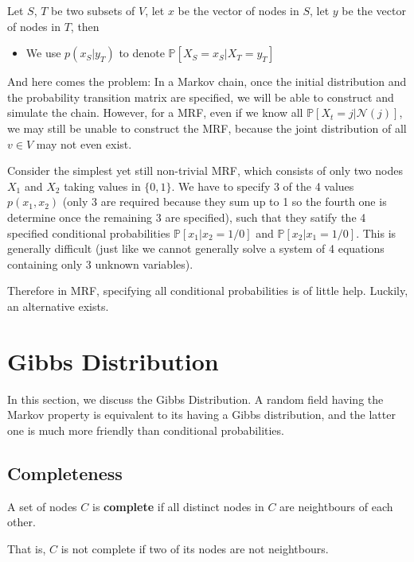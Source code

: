         Let $S$, $T$ be two subsets of $V$, let $x$ be the vector of nodes in $S$, let $y$ be the vector of nodes in $T$, then
        \begin{itemize}
            \item We use $p(x_S|y_T)$ to denote $\mathbb{P}[X_S=x_S|X_T=y_T]$
        \end{itemize}

        And here comes the problem: In a Markov chain, once the initial distribution and the probability transition matrix are specified, we will be able to construct and simulate the chain. However, for a MRF, even if we know all $\mathbb{P}[X_t=j|\mathcal{N}(j)]$, we may still be unable to construct the MRF, because the joint distribution of all $v \in V$ may not even exist.

        Consider the simplest yet still non-trivial MRF, which consists of only two nodes $X_1$ and $X_2$ taking values in $\{0,1\}$. We have to specify 3 of the 4 values $p(x_1, x_2)$ (only 3 are required because they sum up to 1 so the fourth one is determine once the remaining 3 are specified), such that they satify the 4 specified conditional probabilities $\mathbb{P}[x_1|x_2=1/0]$ and $\mathbb{P}[x_2|x_1=1/0]$. This is generally difficult (just like we cannot generally solve a system of 4 equations containing only 3 unknown variables).

        Therefore in MRF, specifying all conditional probabilities is of little help. Luckily, an alternative exists.


\section{Gibbs Distribution}
    In this section, we discuss the Gibbs Distribution. A random field having the Markov property is equivalent to its having a Gibbs distribution, and the latter one is much more friendly than conditional probabilities.

    \subsection{Completeness}
        \begin{definition}\label{Def:CompleteGraph}
            A set of nodes $C$ is \textbf{complete} if all distinct nodes in $C$ are neightbours of each other.
        \end{definition}
        \begin{remark}
            That is, $C$ is not complete if two of its nodes are not neightbours.
        \end{remark}

